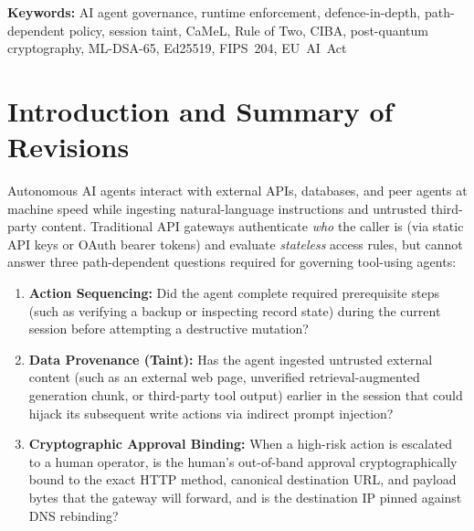 \documentclass[11pt, a4paper]{article}
\begin{document}
\begin{abstract}
\noindent\textbf{Limitations:} Because the evaluation relies on an author-written test corpus rather than an adaptive human red team, it demonstrates that the deterministic and heuristic controls execute as designed in code --- not that the heuristic classifiers resist an adaptive adversary. We provide an explicit component-by-component matrix distinguishing what is wired in code from what is deployment-supplied or architectural specification, document fail-open versus fail-closed behaviour across every stage, analyse taint-bypass and compromised-infrastructure boundaries, and state twelve operational limitations.
\end{abstract}

\vspace{0.5em}
\noindent\textbf{Keywords:} AI agent governance, runtime enforcement, defence-in-depth, path-dependent policy, session taint, CaMeL, Rule of Two, CIBA, post-quantum cryptography, ML-DSA-65, Ed25519, FIPS~204, EU~AI~Act

\newpage
\tableofcontents
\newpage

\section{Introduction and Summary of Revisions}
\label{sec:introduction}

Autonomous AI agents interact with external APIs, databases, and peer agents at machine speed while ingesting natural-language instructions and untrusted third-party content. Traditional API gateways authenticate \emph{who} the caller is (via static API keys or OAuth bearer tokens) and evaluate \emph{stateless} access rules, but cannot answer three path-dependent questions required for governing tool-using agents:

\begin{enumerate}[label=\arabic*., leftmargin=2em]
    \item \textbf{Action Sequencing:} Did the agent complete required prerequisite steps (such as verifying a backup or inspecting record state) during the current session before attempting a destructive mutation?
    \item \textbf{Data Provenance (Taint):} Has the agent ingested untrusted external content (such as an external web page, unverified retrieval-augmented generation chunk, or third-party tool output) earlier in the session that could hijack its subsequent write actions via indirect prompt injection?
    \item \textbf{Cryptographic Approval Binding:} When a high-risk action is escalated to a human operator, is the human's out-of-band approval cryptographically bound to the exact HTTP method, canonical destination URL, and payload bytes that the gateway will forward, and is the destination IP pinned against DNS rebinding?
\end{enumerate}
\end{document}

